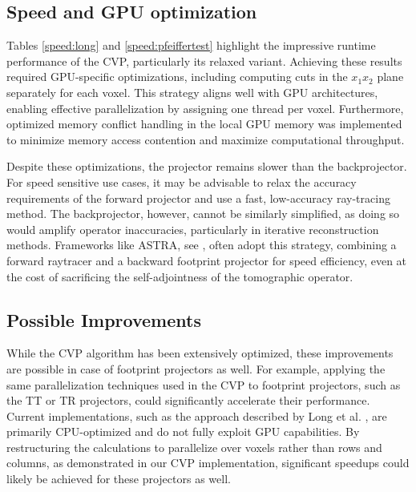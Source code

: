 \subsection{Speed and GPU optimization}
Tables \ref{speed:long} and \ref{speed:pfeiffertest} highlight the impressive runtime performance of the CVP, particularly its relaxed variant. Achieving these results required GPU-specific optimizations, including computing cuts in the $x_1x_2$ plane separately for each voxel. This strategy aligns well with GPU architectures, enabling effective parallelization by assigning one thread per voxel. Furthermore, optimized memory conflict handling in the local GPU memory was implemented to minimize memory access contention and maximize computational throughput.

Despite these optimizations, the projector remains slower than the backprojector. For speed sensitive use cases, it may be advisable to relax the accuracy requirements of the forward projector and use a fast, low-accuracy ray-tracing method. The backprojector, however, cannot be similarly simplified, as doing so would amplify operator inaccuracies, particularly in iterative reconstruction methods. Frameworks like ASTRA, see \cite{ASTRA2016}, often adopt this strategy, combining a forward raytracer and a backward footprint projector for speed efficiency, even at the cost of sacrificing the self-adjointness of the tomographic operator.

\subsection{Possible Improvements}
While the CVP algorithm has been extensively optimized, these improvements are possible in case of footprint projectors as well. For example, applying the same parallelization techniques used in the CVP to footprint projectors, such as the TT or TR projectors, could significantly accelerate their performance. Current implementations, such as the approach described by Long et al. \cite{Long2010}, are primarily CPU-optimized and do not fully exploit GPU capabilities. By restructuring the calculations to parallelize over voxels rather than rows and columns, as demonstrated in our CVP implementation, significant speedups could likely be achieved for these projectors as well.


